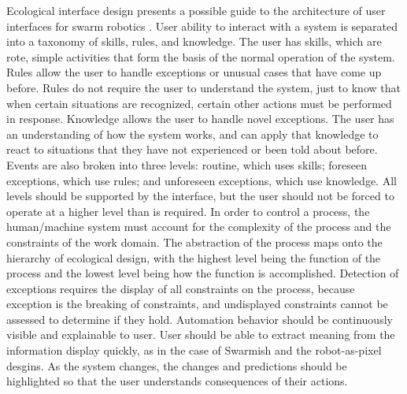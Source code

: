 \documentclass[]{article}
\begin{document}
Ecological interface design presents a possible guide to the architecture of user interfaces for swarm robotics \cite{vicente1992ecological}. 
User ability to interact with a system is separated into a taxonomy of skills, rules, and knowledge. 
The user has skills, which are rote, simple activities that form the basis of the normal operation of the system. 
Rules allow the user to handle exceptions or unusual cases that have come up before. 
Rules do not require the user to understand the system, just to know that when certain situations are recognized, certain other actions must be performed in response. 
Knowledge allows the user to handle novel exceptions. 
The user has an understanding of how the system works, and can apply that knowledge to react to situations that they have not experienced or been told about before. 
Events are also broken into three levels: routine, which uses skills; foreseen exceptions, which use rules; and unforeseen exceptions, which use knowledge. 
All levels should be supported by the interface, but the user should not be forced to operate at a higher level than is required. 
In order to control a process, the human/machine system must account for the complexity of the process and the constraints of the work domain. 
The abstraction of the process maps onto the hierarchy of ecological design, with the highest level being the function of the process and the lowest level being how the function is accomplished. 
Detection of exceptions requires the display of all constraints on the process, because exception is the breaking of constraints, and undisplayed constraints cannot be assessed to determine if they hold.
Automation behavior should be continuously visible and explainable to user. 
User should be able to extract meaning from the information display quickly, as in the case of Swarmish and the robot-as-pixel desgins.
As the system changes, the changes and predictions should be highlighted so that the user understands consequences of their actions. 
\end{document}

